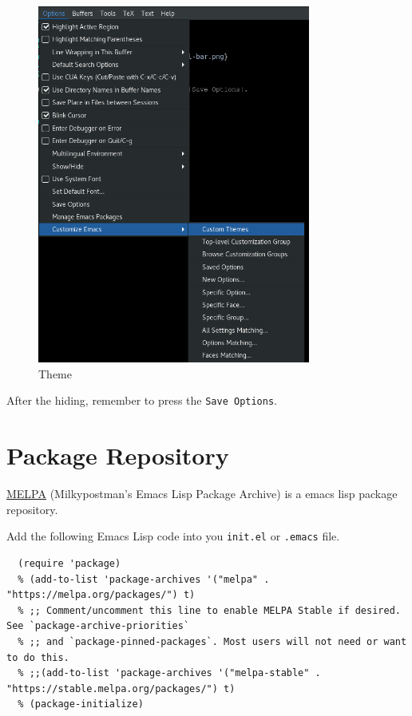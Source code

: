 \begin{figure}[!ht]
  \label{fig:theme}
  \centering
  \includegraphics[width=0.8\textwidth]{theme.png}
  \caption{Theme}
\end{figure}
After the hiding, remember to press the \verb|Save Options|.
\clearpage

\section{Package Repository}
\href{https://www.melpa.org/}{MELPA} (Milkypostman's Emacs Lisp Package Archive) is a emacs lisp package repository.

Add the following Emacs Lisp code into you \verb|init.el| or \verb|.emacs| file.
\begin{lstlisting}
  (require 'package)
  % (add-to-list 'package-archives '("melpa" . "https://melpa.org/packages/") t)
  % ;; Comment/uncomment this line to enable MELPA Stable if desired.  See `package-archive-priorities`
  % ;; and `package-pinned-packages`. Most users will not need or want to do this.
  % ;;(add-to-list 'package-archives '("melpa-stable" . "https://stable.melpa.org/packages/") t)
  % (package-initialize)
\end{lstlisting}


